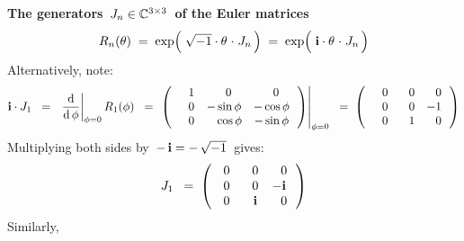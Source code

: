 
\noindent
\textbf{The generators \,$J_{n} \in \mathbb{C}^{3 \times 3}$\, of the Euler matrices}
\begin{equation*}
R_{n}(\theta)
\; = \;
	\exp\!\left(\;\sqrt{-1}\cdot\theta \overset{{\color{white}1}}{\cdot} J_{n}\,\right)
\; = \;
	\exp\!\left(\;\i\cdot\theta \overset{{\color{white}1}}{\cdot} J_{n}\,\right)
\end{equation*}
Alternatively, note:
\begin{equation*}
\i \cdot J_{1}
\;\; = \;\;
	\left.\dfrac{\d}{\d\,\phi}\right\vert_{\phi = 0} R_{1}(\phi)
\;\; = \;
	\left.\left(\,
		\begin{array}{ccc}
			{\color{white}-}1 & {\color{white}-}0 & {\color{white}-}0 \\
			{\color{white}-}0 & {\color{black}-}\sin\phi & {\color{black}-}\cos\phi \\
			{\color{white}-}0 & {\color{white}-}\cos\phi & {\color{black}-}\sin\phi \\
			\end{array}
		\,\right)\right\vert_{\phi = 0}
\;\; = \;
	\left(\,
		\begin{array}{ccc}
			{\color{white}-}0 & {\color{white}-}0 & {\color{white}-}0 \\
			{\color{white}-}0 & {\color{white}-}0 & {\color{black}-}1 \\
			{\color{white}-}0 & {\color{white}-}1 & {\color{white}-}0 \\
			\end{array}
		\,\right)
\end{equation*}
Multiplying both sides by \,$-\,\textnormal{\bf i} = -\,\sqrt{-1}$\, gives:
\begin{equation*}
J_{1}
\;\; = \;
	\left(\!\!
		\begin{array}{ccc}
			{\color{white}-}0 & {\color{white}-}0 & {\color{white}-}0 \\
			{\color{white}-}0 & {\color{white}-}0 & {\color{black}-}\i \\
			{\color{white}-}0 & {\color{white}-}\i & {\color{white}-}0 \\
			\end{array}
		\,\right)
\end{equation*}
Similarly,
